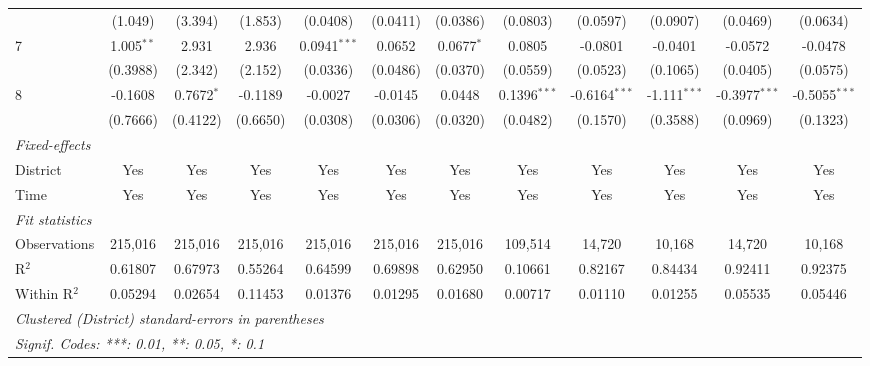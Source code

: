 \begin{table}[htbp]
\begin{tabular}{lccccccccccc}
                           & (1.049)        & (3.394)       & (1.853)        & (0.0408)       & (0.0411)       & (0.0386)       & (0.0803)            & (0.0597)        & (0.0907)        & (0.0469)         & (0.0634)\\   
      7                    & 1.005$^{**}$   & 2.931         & 2.936          & 0.0941$^{***}$ & 0.0652         & 0.0677$^{*}$   & 0.0805              & -0.0801         & -0.0401         & -0.0572          & -0.0478\\   
                           & (0.3988)       & (2.342)       & (2.152)        & (0.0336)       & (0.0486)       & (0.0370)       & (0.0559)            & (0.0523)        & (0.1065)        & (0.0405)         & (0.0575)\\   
      8                    & -0.1608        & 0.7672$^{*}$  & -0.1189        & -0.0027        & -0.0145        & 0.0448         & 0.1396$^{***}$      & -0.6164$^{***}$ & -1.111$^{***}$  & -0.3977$^{***}$  & -0.5055$^{***}$\\   
                           & (0.7666)       & (0.4122)      & (0.6650)       & (0.0308)       & (0.0306)       & (0.0320)       & (0.0482)            & (0.1570)        & (0.3588)        & (0.0969)         & (0.1323)\\   
      \midrule
      \emph{Fixed-effects}\\
      District             & Yes            & Yes           & Yes            & Yes            & Yes            & Yes            & Yes                 & Yes             & Yes             & Yes              & Yes\\  
      Time                 & Yes            & Yes           & Yes            & Yes            & Yes            & Yes            & Yes                 & Yes             & Yes             & Yes              & Yes\\  
      \midrule
      \emph{Fit statistics}\\
      Observations         & 215,016        & 215,016       & 215,016        & 215,016        & 215,016        & 215,016        & 109,514             & 14,720          & 10,168          & 14,720           & 10,168\\  
      R$^2$                & 0.61807        & 0.67973       & 0.55264        & 0.64599        & 0.69898        & 0.62950        & 0.10661             & 0.82167         & 0.84434         & 0.92411          & 0.92375\\  
      Within R$^2$         & 0.05294        & 0.02654       & 0.11453        & 0.01376        & 0.01295        & 0.01680        & 0.00717             & 0.01110         & 0.01255         & 0.05535          & 0.05446\\  
      \midrule \midrule
      \multicolumn{12}{l}{\emph{Clustered (District) standard-errors in parentheses}}\\
      \multicolumn{12}{l}{\emph{Signif. Codes: ***: 0.01, **: 0.05, *: 0.1}}\\
   \end{tabular}
\end{table}


